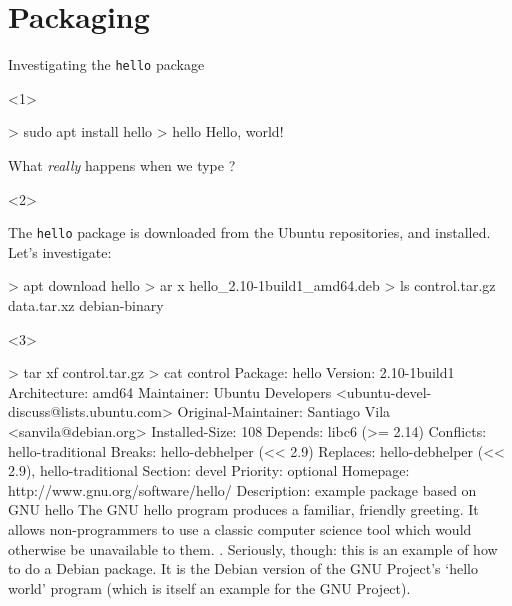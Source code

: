 \documentclass[compress]{beamer}
\begin{document}
\section{Packaging}

\begin{frame}[fragile,label=deb]{Investigating the \texttt{hello} package}
    \begin{onlyenv}<1>

\begin{shcode}
> sudo apt install hello
> hello
Hello, world!
\end{shcode}

    What \emph{really} happens when we type ?

    \end{onlyenv}
    \begin{onlyenv}<2>

    The \texttt{hello} package is downloaded from the Ubuntu repositories, and
    installed. Let's investigate:

\begin{shcode}
> apt download hello
> ar x hello_2.10-1build1_amd64.deb
> ls
control.tar.gz  data.tar.xz  debian-binary
\end{shcode}

    \end{onlyenv}
    \begin{onlyenv}<3>


\begin{shcode}
> tar xf control.tar.gz
> cat control
Package: hello
Version: 2.10-1build1
Architecture: amd64
Maintainer: Ubuntu Developers <ubuntu-devel-discuss@lists.ubuntu.com>
Original-Maintainer: Santiago Vila <sanvila@debian.org>
Installed-Size: 108
Depends: libc6 (>= 2.14)
Conflicts: hello-traditional
Breaks: hello-debhelper (<< 2.9)
Replaces: hello-debhelper (<< 2.9), hello-traditional
Section: devel
Priority: optional
Homepage: http://www.gnu.org/software/hello/
Description: example package based on GNU hello
 The GNU hello program produces a familiar, friendly greeting.  It
 allows non-programmers to use a classic computer science tool which
 would otherwise be unavailable to them.
 .
 Seriously, though: this is an example of how to do a Debian package.
 It is the Debian version of the GNU Project's `hello world' program
 (which is itself an example for the GNU Project).
\end{shcode}

    \end{onlyenv}
\end{frame}
\end{document}
